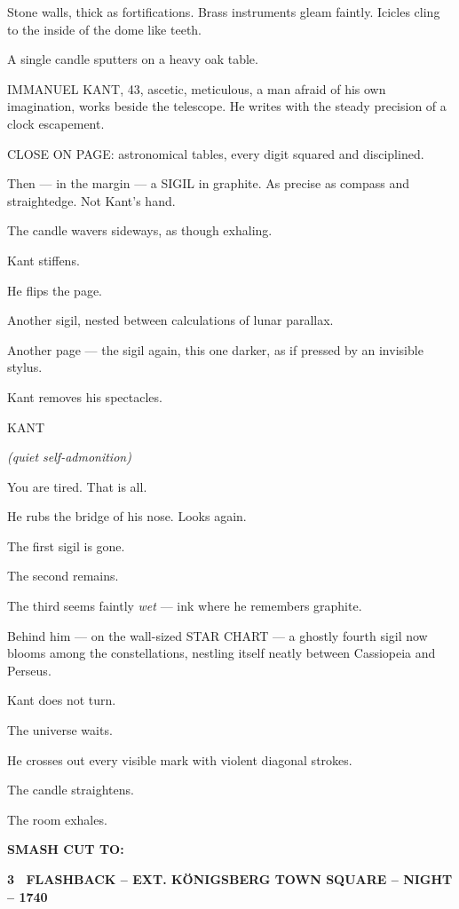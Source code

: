 \documentclass[12pt]{article}
\newcommand{\scene}[2]{%
  \vspace{1.8\baselineskip}%
  \noindent\textbf{#1 \ #2}\par\vspace{0.4\baselineskip}%
}
\newenvironment{dialogue}[1]{%
  \vspace{0.8\baselineskip}%
  \noindent\hspace*{2.3in}\textsc{#1}\par%
  \noindent\hspace*{1.5in}\begin{minipage}[t]{4.5in}%
}{%
  \end{minipage}\par%
}
\newcommand{\paren}[1]{%
  \noindent\hspace*{1.8in}\textit{(#1)}\par%
}
\newcommand{\transition}[1]{%
  \vspace{0.6\baselineskip}%
  \begin{flushright}\textbf{#1}\end{flushright}%
}
\begin{document}
Stone walls, thick as fortifications. Brass instruments gleam faintly.
Icicles cling to the inside of the dome like teeth.

A single candle sputters on a heavy oak table.

IMMANUEL KANT, 43, ascetic, meticulous, a man afraid of his own
imagination, works beside the telescope. He writes with the steady
precision of a clock escapement.

CLOSE ON PAGE: astronomical tables, every digit squared and disciplined.

Then --- in the margin --- a SIGIL in graphite. As precise as compass
and straightedge. Not Kant's hand.

The candle wavers sideways, as though exhaling.

Kant stiffens.

He flips the page.

Another sigil, nested between calculations of lunar parallax.

Another page --- the sigil again, this one darker, as if pressed by an
invisible stylus.

Kant removes his spectacles.

\begin{dialogue}{KANT}
\paren{quiet self-admonition}
You are tired. That is all.
\end{dialogue}

He rubs the bridge of his nose. Looks again.

The first sigil is gone.

The second remains.

The third seems faintly \emph{wet} --- ink where he remembers graphite.

Behind him --- on the wall-sized STAR CHART --- a ghostly fourth sigil
now blooms among the constellations, nestling itself neatly between
Cassiopeia and Perseus.

Kant does not turn.

The universe waits.

He crosses out every visible mark with violent diagonal strokes.

The candle straightens.

The room exhales.

\transition{SMASH CUT TO:}


\scene{3}{FLASHBACK -- EXT. KÖNIGSBERG TOWN SQUARE -- NIGHT -- 1740}
\end{document}
